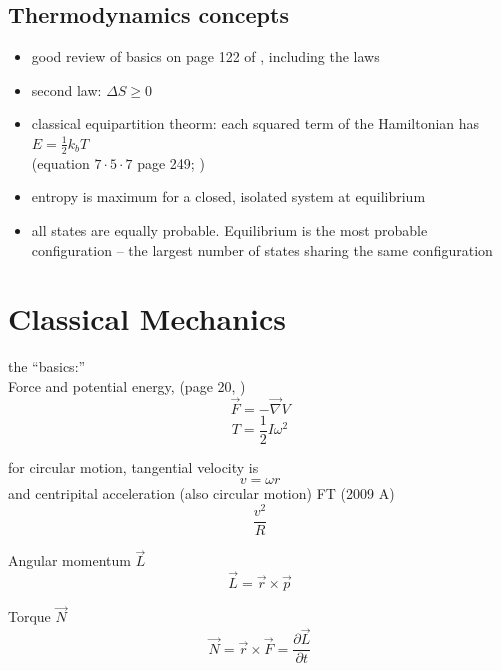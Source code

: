 \documentclass[12pt]{article}  %
\newcommand{\pfrac}[2]{\frac{\partial #1}{\partial #2}}
\def\qualifyingyear{F}
\begin{document}
\subsection{Thermodynamics concepts}
\begin{itemize}
	\item good review of basics on page 122 of \cite{ReifThermo}, including the laws 
	\item second law: $\Delta S \geq 0$
	\item classical equipartition theorm: each squared term of the Hamiltonian
	has $E=\frac{1}{2}k_b T$ \\ (equation $7 \cdot 5 \cdot 7$ page 249; \cite{ReifThermo})
	\item entropy is maximum for a closed, isolated system at equilibrium
	\item all states are equally probable. Equilibrium is the most probable configuration -- the largest number of states sharing the same configuration
\end{itemize}

\section{Classical Mechanics}
the ``basics:'' \\ 
Force and potential energy, (page 20, \cite{GoldsteinCM})
\begin{equation}
\vec{F} = - \vec{\nabla} V
\end{equation}
\begin{equation}
 T = \frac{1}{2} I \omega^2
\end{equation}

for circular motion, tangential velocity is
\begin{equation}
v = \omega r
\end{equation}
and centripital acceleration (also circular motion)
\if\qualifyingyear T
(2009 A)
\fi
\begin{equation}
\frac{v^2}{R}
\end{equation}

Angular momentum $\vec{L}$
\begin{equation}
\vec{L} = \vec{r} \times \vec{p}
\end{equation}

Torque $\vec{N}$
\begin{equation}
 \vec{N} = \vec{r}\times \vec{F} = \pfrac{\vec{L}}{t}
\end{equation}
\end{document}
